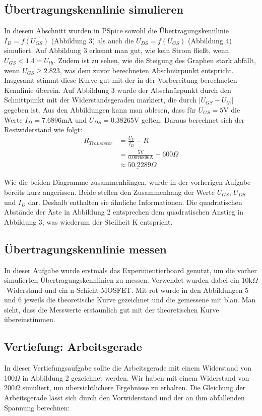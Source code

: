 \documentclass[12pt,a4paper]{scrartcl}
\begin{document}
\subsection{\"Ubertragungskennlinie simulieren}
In diesem Abschnitt wurden in PSpice sowohl die \"Ubertragungskennlinie $I_D=f(U_{GS})$ (Abbildung 3) als auch die $U_{DS}=f(U_{GS})$ (Abbildung 4) simuliert.
Auf Abbildung 3 erkennt man gut, wie kein Strom flie\ss t, wenn $U_{GS} < 1.4=U_{th}$.
Zudem ist zu sehen, wie die Steigung des Graphen stark abf\"allt, wenn $U_{GS} \geq 2.823$, was dem zuvor berechneten Abschn\"urpunkt entspricht.
Insgesamt stimmt diese Kurve gut mit der in der Vorbereitung berechneten Kennlinie \"uberein.
Auf Abbildung 3 wurde der Abschn\"urpunkt durch den Schnittpunkt mit der Widerstandsgeraden markiert, die durch $|U_{GS} - U_{th}|$ gegeben ist.
Aus den Abbildungen kann man ablesen, dass f\"ur $U_{GS} = 5$V die Werte $I_D = 7.6896$mA und $U_{DS} = 0.38265$V gelten.
Daraus berechnet sich der Restwiderstand wie folgt:
\begin{align*}
R_{Transistor} & = \frac{U_V}{I_D} -R\\
& = \frac{5\text{V}}{0.0076896\text{A}} - 600\Omega \\
& \underline{ \approx 50.2289\Omega}
\end{align*}

Wie die beiden Diagramme zusammenh\"angen, wurde in der vorherigen Aufgabe bereits kurz angerissen.
Beide stellen den Zusammenhang der Werte $U_{GS}$, $U_{DS}$ und $I_D$ dar.
Deshalb enthalten sie \"ahnliche Informationen.
Die quadratischen Abst\"ande der \"Aste in Abbildung 2 entsprechen dem quadratischen Anstieg in Abbildung 3, was wiederum der Steilheit K entspricht.

\subsection{\"Ubertragungskennlinie messen}
In dieser Aufgabe wurde erstmals das Experimentierboard genutzt, um die vorher simulierten \"Ubertragungskennlinien zu messen.
Verwendet wurden dabei ein 10k$\Omega$-Widerstand und ein n-Schicht-MOSFET.
Mit rot wurde in den Abbildungen 5 und 6 jeweils die theoretische Kurve gezeichnet und die gemessene mit blau.
Man sieht, dass die Messwerte erstaunlich gut mit der theoretischen Kurve \"ubereinstimmen.

\subsection*{Vertiefung: Arbeitsgerade}
In dieser Vertiefungsaufgabe sollte die Arbeitsgerade mit einem Widerstand von 100$\Omega$ in Abbildung 2 gezeichnet werden.
Wir haben mit einem Widerstand von 200$\Omega$ simuliert, um \"ubersichtlichere Ergebnisse zu erhalten.
Die Gleichung der Arbeitsgerade l\"asst sich durch den Vorwiderstand und der an ihm abfallenden Spannung berechnen:
\end{document}

